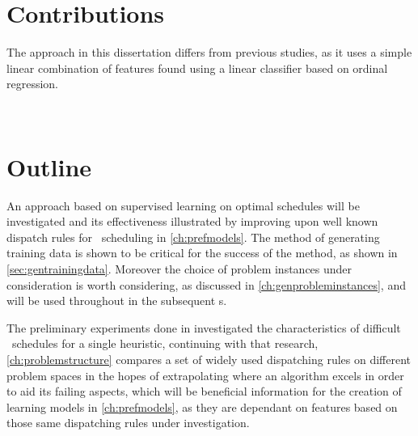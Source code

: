 \section{Contributions}
The approach in this dissertation differs from previous studies, as it uses a simple linear combination of features found using a linear classifier based on ordinal regression.  

\hfill\\\vspace{3cm}

\section{Outline}
An approach based on supervised learning on optimal schedules will be investigated and its effectiveness illustrated by improving upon well known dispatch rules for \jsp\ scheduling in \cref{ch:prefmodels}. The method of generating training data is shown to be critical for the success of the method, as shown in \cref{sec:gentrainingdata}. Moreover the choice of problem instances under consideration is worth considering, as discussed in \cref{ch:genprobleminstances}, and will be used throughout in the subsequent s. 


The preliminary experiments done in \citet{InRu12} investigated the characteristics of difficult \jsp\ schedules for a single heuristic, continuing with that research, \cref{ch:problemstructure} compares a set of widely used dispatching rules on different problem spaces in the hopes of extrapolating where an algorithm excels in order to aid its failing aspects, which will be beneficial information for the creation of learning models in \cref{ch:prefmodels}, as they are dependant  on features based on those same dispatching rules under investigation.


\hfill\\\vspace{3cm}



